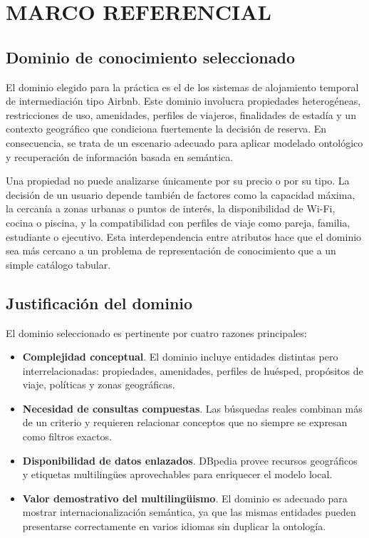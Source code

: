 \section{MARCO REFERENCIAL}

\subsection{Dominio de conocimiento seleccionado}

El dominio elegido para la práctica es el de los sistemas de alojamiento temporal de
intermediación tipo Airbnb. Este dominio involucra propiedades heterogéneas,
restricciones de uso, amenidades, perfiles de viajeros, finalidades de estadía y un
contexto geográfico que condiciona fuertemente la decisión de reserva. En consecuencia,
se trata de un escenario adecuado para aplicar modelado ontológico y recuperación de
información basada en semántica.

Una propiedad no puede analizarse únicamente por su precio o por su tipo. La decisión de
un usuario depende también de factores como la capacidad máxima, la cercanía a zonas
urbanas o puntos de interés, la disponibilidad de Wi-Fi, cocina o piscina, y la
compatibilidad con perfiles de viaje como pareja, familia, estudiante o ejecutivo. Esta
interdependencia entre atributos hace que el dominio sea más cercano a un problema de
representación de conocimiento que a un simple catálogo tabular.

\subsection{Justificación del dominio}

El dominio seleccionado es pertinente por cuatro razones principales:

\begin{itemize}
  \item \textbf{Complejidad conceptual}. El dominio incluye entidades distintas pero
  interrelacionadas: propiedades, amenidades, perfiles de huésped, propósitos de viaje,
  políticas y zonas geográficas.

  \item \textbf{Necesidad de consultas compuestas}. Las búsquedas reales combinan más de
  un criterio y requieren relacionar conceptos que no siempre se expresan como filtros
  exactos.

  \item \textbf{Disponibilidad de datos enlazados}. DBpedia provee recursos geográficos
  y etiquetas multilingües aprovechables para enriquecer el modelo local.

  \item \textbf{Valor demostrativo del multilingüismo}. El dominio es adecuado para
  mostrar internacionalización semántica, ya que las mismas entidades pueden presentarse
  correctamente en varios idiomas sin duplicar la ontología.
\end{itemize}

